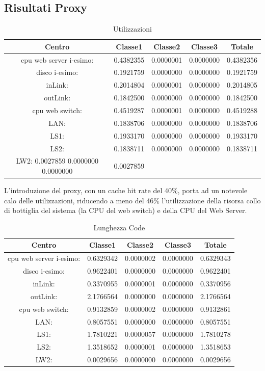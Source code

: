 \subsection{Risultati Proxy}
\begin{table}[htbp]
\begin{center}
\begin{tabular}{|c|c|c|c|c|}
\hline
Centro &Classe1 &Classe2 &Classe3 &Totale\\
\hline
\hline
 cpu web server i-esimo: 	&0.4382355	&0.0000001	&0.0000000	&0.4382356\\
\hline
 disco i-esimo: 	&0.1921759	&0.0000000	&0.0000000	&0.1921759\\
\hline
 inLink: 	&0.2014804	&0.0000001	&0.0000000	&0.2014805\\
\hline
 outLink: 	&0.1842500	&0.0000000	&0.0000000	&0.1842500\\
\hline
 cpu web switch: 	&0.4519287	&0.0000001	&0.0000000	&0.4519288\\
\hline
 LAN: 	&0.1838706	&0.0000000	&0.0000000	&0.1838706\\
\hline
 LS1: 	&0.1933170	&0.0000000	&0.0000000	&0.1933170\\
\hline
 LS2:	&0.1838711	&0.0000000	&0.0000000	&0.1838711\\
\hline
 LW2: 	0.0027859	0.0000000	0.0000000	&0.0027859\\
\hline
\end{tabular}
\end{center}
\caption{Utilizzazioni}
\label{utilizzazioni}
\end{table}
L'introduzione del proxy, con un cache hit rate del 40\%, porta ad un notevole calo delle utilizzazioni, riducendo a meno del 46\% l'utilizzazione della risorsa collo di bottiglia del sistema (la CPU del web switch) e della CPU del Web Server. 
\begin{table}[htbp]
\begin{center}
\begin{tabular}{|c|c|c|c|c|}
\hline
Centro &Classe1 &Classe2 &Classe3 &Totale\\
\hline
\hline
 cpu web server i-esimo: 	&0.6329342	&0.0000002	&0.0000000	&0.6329343\\
\hline
 disco i-esimo: 	&0.9622401	&0.0000000	&0.0000000	&0.9622401\\
\hline
 inLink: 	&0.3370955	&0.0000001	&0.0000000	&0.3370956\\
\hline
 outLink: 	&2.1766564	&0.0000000	&0.0000000	&2.1766564\\
\hline
 cpu web switch: 	&0.9132859	&0.0000002	&0.0000000	&0.9132861\\
\hline
 LAN: 	&0.8057551	&0.0000000	&0.0000000	&0.8057551\\
\hline
 LS1: 	&1.7810221	&0.0000057	&0.0000000	&1.7810278\\
\hline
 LS2: 	&1.3518652	&0.0000001	&0.0000000	&1.3518653\\
\hline
 LW2: 	&0.0029656	&0.0000000	&0.0000000	&0.0029656\\
\hline
\end{tabular}
\end{center}
\caption{Lunghezza Code}
\label{lunghezzacode}
\end{table}
